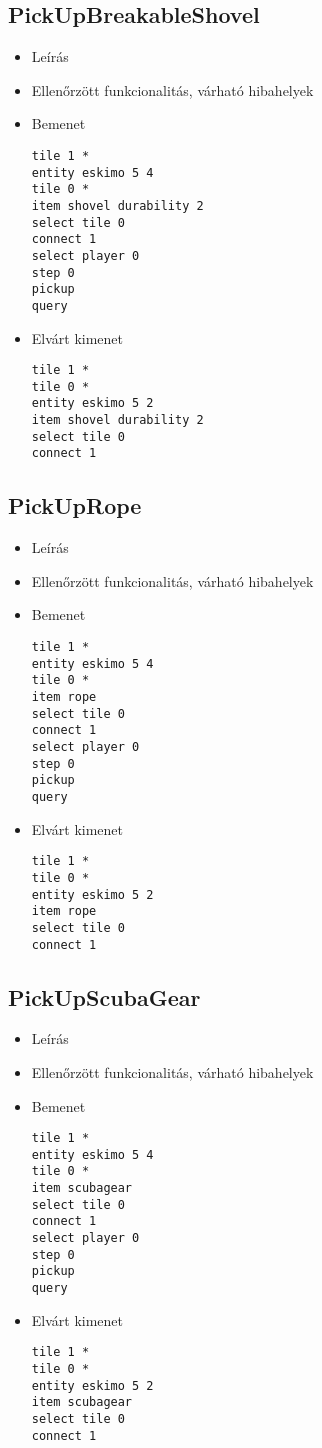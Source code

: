 \subsection{PickUpBreakableShovel}
\begin{itemize}
\item Leírás\newline
\item Ellenőrzött funkcionalitás, várható hibahelyek
\item Bemenet
\begin{lstlisting}
tile 1 *
entity eskimo 5 4
tile 0 *
item shovel durability 2
select tile 0
connect 1
select player 0
step 0
pickup
query
\end{lstlisting}
\item Elvárt kimenet
\begin{lstlisting}
tile 1 *
tile 0 *
entity eskimo 5 2
item shovel durability 2
select tile 0
connect 1
\end{lstlisting}
\end{itemize}

\subsection{PickUpRope}
\begin{itemize}
\item Leírás\newline
\item Ellenőrzött funkcionalitás, várható hibahelyek
\item Bemenet
\begin{lstlisting}
tile 1 *
entity eskimo 5 4
tile 0 *
item rope
select tile 0
connect 1
select player 0
step 0
pickup
query
\end{lstlisting}
\item Elvárt kimenet
\begin{lstlisting}
tile 1 *
tile 0 *
entity eskimo 5 2
item rope
select tile 0
connect 1
\end{lstlisting}
\end{itemize}

\subsection{PickUpScubaGear}
\begin{itemize}
\item Leírás\newline
\item Ellenőrzött funkcionalitás, várható hibahelyek
\item Bemenet
\begin{lstlisting}
tile 1 *
entity eskimo 5 4
tile 0 *
item scubagear
select tile 0
connect 1
select player 0
step 0
pickup
query
\end{lstlisting}
\item Elvárt kimenet
\begin{lstlisting}
tile 1 *
tile 0 *
entity eskimo 5 2
item scubagear
select tile 0
connect 1
\end{lstlisting}
\end{itemize}

